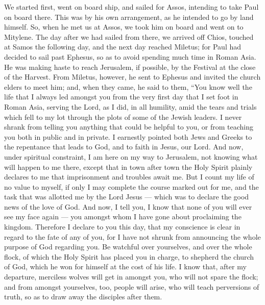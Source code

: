 We started first, went on board ship, and sailed for
Assos, intending to take Paul on board there. This was by his own
arrangement, as he intended to go by land himself.  So,
when he met us at Assos, we took him on board and went on to Mitylene.
 The day after we had sailed from there, we arrived off
Chios, touched at Samos the following day, and the next day reached
Miletus;  for Paul had decided to sail past Ephesus, so as
to avoid spending much time in Roman Asia. He was making haste to reach
Jerusalem, if possible, by the Festival at the close of the Harvest.
 From Miletus, however, he sent to Ephesus and invited the
church elders to meet him;  and, when they came, he said to
them, ``You know well the life that I always led amongst you from the
very first day that I set foot in Roman Asia,  serving the
Lord, as I did, in all humility, amid the tears and trials which fell to
my lot through the plots of some of the Jewish leaders.  I
never shrank from telling you anything that could be helpful to you, or
from teaching you both in public and in private.  I
earnestly pointed both Jews and Greeks to the repentance that leads to
God, and to faith in Jesus, our Lord.  And now, under
spiritual constraint, I am here on my way to Jerusalem, not knowing what
will happen to me there,  except that in town after town
the Holy Spirit plainly declares to me that imprisonment and troubles
await me.  But I count my life of no value to myself, if
only I may complete the course marked out for me, and the task that was
allotted me by the Lord Jesus --- which was to declare the good news of
the love of God.  And now, I tell you, I know that none of
you will ever see my face again --- you amongst whom I have gone about
proclaiming the kingdom.  Therefore I declare to you this
day, that my conscience is clear in regard to the fate of any of you,
 for I have not shrunk from announcing the whole purpose of
God regarding you.  Be watchful over yourselves, and over
the whole flock, of which the Holy Spirit has placed you in charge, to
shepherd the church of God, which he won for himself at the cost of his
life.  I know that, after my departure, merciless wolves
will get in amongst you, who will not spare the flock;  and
from amongst yourselves, too, people will arise, who will teach
perversions of truth, so as to draw away the disciples after them.
